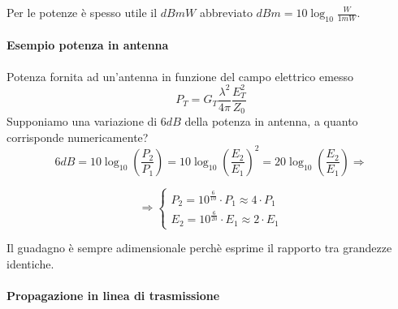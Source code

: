 Per le potenze è spesso utile il $\si{dB}mW $ abbreviato $\si{dB}m = 10\log_{10}\frac{W}{1 mW}$.

\paragraph{Esempio potenza in antenna}
Potenza fornita ad un'antenna in funzione del campo elettrico emesso
$$P_T = G_T \frac{\lambda^2}{4\pi}\frac{E_T^2}{Z_0}$$
Supponiamo una variazione di $6 \si{dB}$ della potenza in antenna, a quanto corrisponde numericamente?
$$6\si{dB} = 10\log_{10}\left(\frac{P_2}{P_1} \right) = 10\log_{10}\left(\frac{E_2}{E_1}\right)^2 =
20\log_{10}\left(\frac{E_2}{E_1}\right) \Rightarrow$$

$$\Rightarrow
\begin{cases}
P_2 = 10^{\frac{6}{10}}\cdot P_1 \approx 4\cdot P_1 \\
E_2 = 10^{\frac{6}{20}}\cdot E_1 \approx 2\cdot E_1
\end{cases}
$$

Il guadagno è sempre adimensionale perchè esprime il rapporto tra grandezze identiche.

\paragraph{Propagazione in linea di trasmissione}


